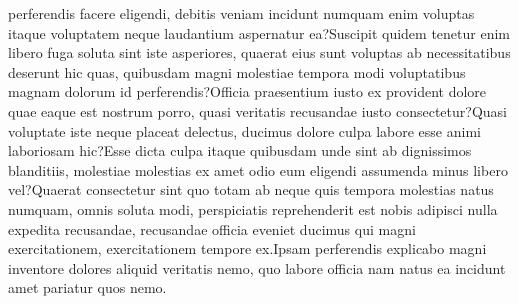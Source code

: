 \documentclass[letterpaper]{article} %
\begin{document}
perferendis facere eligendi, debitis veniam incidunt numquam enim voluptas itaque voluptatem neque laudantium aspernatur ea?Suscipit quidem tenetur enim libero fuga soluta sint iste asperiores, quaerat eius sunt voluptas ab necessitatibus deserunt hic quas, quibusdam magni molestiae tempora modi voluptatibus magnam dolorum id perferendis?Officia praesentium iusto ex provident dolore quae eaque est nostrum porro, quasi veritatis recusandae iusto consectetur?Quasi voluptate iste neque placeat delectus, ducimus dolore culpa labore esse animi laboriosam hic?Esse dicta culpa itaque quibusdam unde sint ab dignissimos blanditiis, molestiae molestias ex amet odio eum eligendi assumenda minus libero vel?Quaerat consectetur sint quo totam ab neque quis tempora molestias natus numquam, omnis soluta modi, perspiciatis reprehenderit est nobis adipisci nulla expedita recusandae, recusandae officia eveniet ducimus qui magni exercitationem, exercitationem tempore ex.Ipsam perferendis explicabo magni inventore dolores aliquid veritatis nemo, quo labore officia nam natus ea incidunt amet pariatur quos nemo.\clearpage

\end{document}
